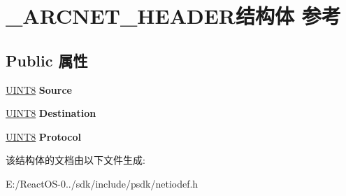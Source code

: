\hypertarget{struct___a_r_c_n_e_t___h_e_a_d_e_r}{}\section{\+\_\+\+A\+R\+C\+N\+E\+T\+\_\+\+H\+E\+A\+D\+E\+R结构体 参考}
\label{struct___a_r_c_n_e_t___h_e_a_d_e_r}
\subsection*{Public 属性}
\begin{DoxyCompactItemize}
\item 
\mbox{\label{struct___a_r_c_n_e_t___h_e_a_d_e_r_aac9ea16b0c810555e2ec130a6e4746f2}} 
\hyperlink{_processor_bind_8h_ab27e9918b538ce9d8ca692479b375b6a}{U\+I\+N\+T8} {\bfseries Source}
\item 
\mbox{\label{struct___a_r_c_n_e_t___h_e_a_d_e_r_af6e899642e528ce5c2d9a32d37eb381f}} 
\hyperlink{_processor_bind_8h_ab27e9918b538ce9d8ca692479b375b6a}{U\+I\+N\+T8} {\bfseries Destination}
\item 
\mbox{\label{struct___a_r_c_n_e_t___h_e_a_d_e_r_a555bd782df062034699836cc8d73d86f}} 
\hyperlink{_processor_bind_8h_ab27e9918b538ce9d8ca692479b375b6a}{U\+I\+N\+T8} {\bfseries Protocol}
\end{DoxyCompactItemize}


该结构体的文档由以下文件生成\+:\begin{DoxyCompactItemize}
\item 
E\+:/\+React\+O\+S-\/0../sdk/include/psdk/netiodef.\+h\end{DoxyCompactItemize}
